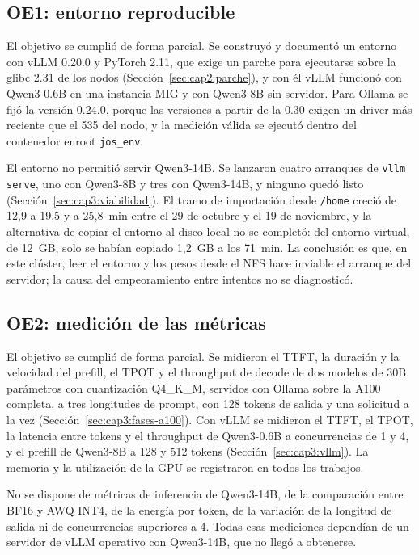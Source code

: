 \subsection{OE1: entorno reproducible}

El objetivo se cumplió de forma parcial. Se construyó y documentó un entorno con vLLM 0.20.0 y PyTorch 2.11, que exige un parche para ejecutarse sobre la glibc 2.31 de los nodos (Sección~\ref{sec:cap2:parche}), y con él vLLM funcionó con Qwen3-0.6B en una instancia MIG y con Qwen3-8B sin servidor. Para Ollama se fijó la versión 0.24.0, porque las versiones a partir de la 0.30 exigen un driver más reciente que el 535 del nodo, y la medición válida se ejecutó dentro del contenedor enroot \texttt{jos\_env}.

El entorno no permitió servir Qwen3-14B. Se lanzaron cuatro arranques de \texttt{vllm serve}, uno con Qwen3-8B y tres con Qwen3-14B, y ninguno quedó listo (Sección~\ref{sec:cap3:viabilidad}). El tramo de importación desde \texttt{/home} creció de 12,9 a 19,5 y a 25,8~min entre el 29 de octubre y el 19 de noviembre, y la alternativa de copiar el entorno al disco local no se completó: del entorno virtual, de 12~GB, solo se habían copiado 1,2~GB a los 71~min. La conclusión es que, en este clúster, leer el entorno y los pesos desde el NFS hace inviable el arranque del servidor; la causa del empeoramiento entre intentos no se diagnosticó.

\subsection{OE2: medición de las métricas}

El objetivo se cumplió de forma parcial. Se midieron el TTFT, la duración y la velocidad del prefill, el TPOT y el throughput de decode de dos modelos de 30B parámetros con cuantización Q4\_K\_M, servidos con Ollama sobre la A100 completa, a tres longitudes de prompt, con 128 tokens de salida y una solicitud a la vez (Sección~\ref{sec:cap3:fases-a100}). Con vLLM se midieron el TTFT, el TPOT, la latencia entre tokens y el throughput de Qwen3-0.6B a concurrencias de 1 y 4, y el prefill de Qwen3-8B a 128 y 512 tokens (Sección~\ref{sec:cap3:vllm}). La memoria y la utilización de la GPU se registraron en todos los trabajos.

No se dispone de métricas de inferencia de Qwen3-14B, de la comparación entre BF16 y AWQ INT4, de la energía por token, de la variación de la longitud de salida ni de concurrencias superiores a 4. Todas esas mediciones dependían de un servidor de vLLM operativo con Qwen3-14B, que no llegó a obtenerse.

